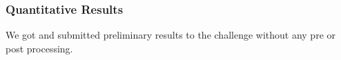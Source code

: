 \documentclass{article}
\begin{document}
\subsubsection{Quantitative Results}
We got and submitted preliminary results to the challenge without any pre or post processing.  
%
\end{document}
